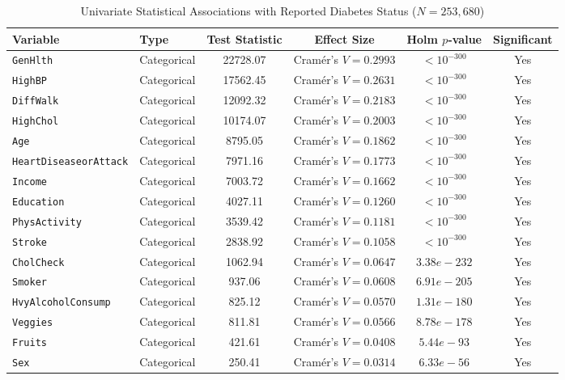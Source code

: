 \begin{table}[htbp]
\centering
\caption{Univariate Statistical Associations with Reported Diabetes Status ($N = 253,680$)}
\label{tab:univariate}
\footnotesize
\setlength{\tabcolsep}{3pt}
\begin{tabular}{@{}llcccc@{}}
\toprule
\textbf{Variable} & \textbf{Type} & \textbf{Test Statistic} & \textbf{Effect Size} & \textbf{Holm $p$-value} & \textbf{Significant} \\
\midrule
\texttt{GenHlth} & Categorical & 22728.07 & Cram\'{e}r's $V = 0.2993$ & $< 10^{-300}$ & Yes \\
\texttt{HighBP} & Categorical & 17562.45 & Cram\'{e}r's $V = 0.2631$ & $< 10^{-300}$ & Yes \\
\texttt{DiffWalk} & Categorical & 12092.32 & Cram\'{e}r's $V = 0.2183$ & $< 10^{-300}$ & Yes \\
\texttt{HighChol} & Categorical & 10174.07 & Cram\'{e}r's $V = 0.2003$ & $< 10^{-300}$ & Yes \\
\texttt{Age} & Categorical & 8795.05 & Cram\'{e}r's $V = 0.1862$ & $< 10^{-300}$ & Yes \\
\texttt{HeartDiseaseorAttack} & Categorical & 7971.16 & Cram\'{e}r's $V = 0.1773$ & $< 10^{-300}$ & Yes \\
\texttt{Income} & Categorical & 7003.72 & Cram\'{e}r's $V = 0.1662$ & $< 10^{-300}$ & Yes \\
\texttt{Education} & Categorical & 4027.11 & Cram\'{e}r's $V = 0.1260$ & $< 10^{-300}$ & Yes \\
\texttt{PhysActivity} & Categorical & 3539.42 & Cram\'{e}r's $V = 0.1181$ & $< 10^{-300}$ & Yes \\
\texttt{Stroke} & Categorical & 2838.92 & Cram\'{e}r's $V = 0.1058$ & $< 10^{-300}$ & Yes \\
\texttt{CholCheck} & Categorical & 1062.94 & Cram\'{e}r's $V = 0.0647$ & $3.38e-232$ & Yes \\
\texttt{Smoker} & Categorical & 937.06 & Cram\'{e}r's $V = 0.0608$ & $6.91e-205$ & Yes \\
\texttt{HvyAlcoholConsump} & Categorical & 825.12 & Cram\'{e}r's $V = 0.0570$ & $1.31e-180$ & Yes \\
\texttt{Veggies} & Categorical & 811.81 & Cram\'{e}r's $V = 0.0566$ & $8.78e-178$ & Yes \\
\texttt{Fruits} & Categorical & 421.61 & Cram\'{e}r's $V = 0.0408$ & $5.44e-93$ & Yes \\
\texttt{Sex} & Categorical & 250.41 & Cram\'{e}r's $V = 0.0314$ & $6.33e-56$ & Yes \\

\end{tabular}
\end{table}
